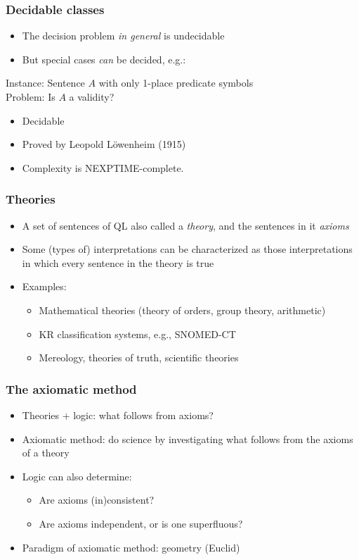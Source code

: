 \begin{frame}
    \frametitle{Decidable classes}

\begin{itemize}
\item The decision problem \emph{in general} is undecidable
\item But special cases \emph{can} be decided, e.g.:
\end{itemize}
\begin{block}{Instance: Sentence $A$ with only 1-place predicate symbols\\
Problem: Is $A$ a validity?}

\begin{itemize}
\item Decidable
\item Proved by Leopold L\"owenheim (1915)
\item Complexity is NEXPTIME-complete.
\end{itemize}
\end{block}
\end{frame}

\begin{frame}
    \frametitle{Theories}

\begin{itemize}[<+->]
\item A set of sentences of QL also called a \emph{theory}, and the sentences in it \emph{axioms}
\item Some (types of) interpretations can be characterized
as those interpretations in which every sentence in the theory is true
\item Examples:
\begin{itemize}[<+->]
\item Mathematical theories (theory of orders, group theory, arithmetic)
\item KR classification systems, e.g., SNOMED-CT
\item Mereology, theories of truth, scientific theories
\end{itemize}
\end{itemize}
\end{frame}

\begin{frame}
    \frametitle{The axiomatic method}

\begin{itemize}[<+->]
\item Theories + logic: what follows from axioms?
\item Axiomatic method: do science by investigating what follows from
  the axioms of a theory
\item Logic can also determine:
\begin{itemize}[<+->]
\item Are axioms (in)consistent?
\item Are axioms independent, or is one superfluous?
\end{itemize}
\item Paradigm of axiomatic method: geometry (Euclid)
\end{itemize}
\end{frame}

